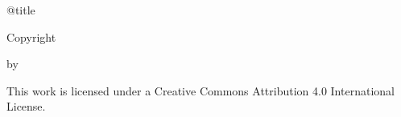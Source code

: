 \begin{center}
  \csname @title\endcsname

  \vspace{5\baselineskip}
  Copyright \MyYear
  \par\vspace{\baselineskip} by
  \par\vspace{\baselineskip} \MyAuthor

  \vspace{5\baselineskip}%
  This work is licensed under a Creative Commons Attribution 4.0 International
  License.
\end{center}

\clearpage
